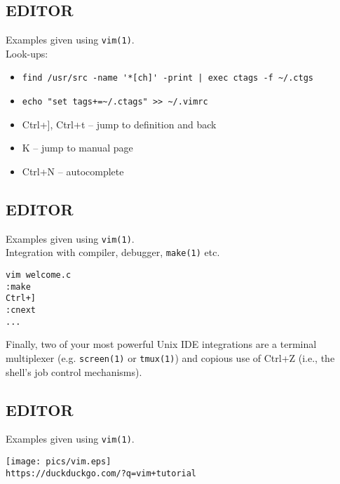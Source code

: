 \documentclass[xga]{xdvislides}
\begin{document}
\subsection{EDITOR}
Examples given using {\tt vim(1)}. \\

Look-ups:
\begin{itemize}
	\item \verb+find /usr/src -name '*[ch]' -print | exec ctags -f ~/.ctgs+
	\item \verb|echo "set tags+=~/.ctags" >> ~/.vimrc|
	\item Ctrl+], Ctrl+t -- jump to definition and back
	\item K -- jump to manual page
	\item Ctrl+N -- autocomplete
\end{itemize}

\subsection{EDITOR}
Examples given using {\tt vim(1)}. \\

Integration with compiler, debugger, \verb+make(1)+
etc.

\begin{verbatim}
vim welcome.c
:make
Ctrl+]
:cnext
...
\end{verbatim}
\vspace{.5in}

Finally, two of your most powerful Unix IDE
integrations are a terminal multiplexer (e.g.
\verb+screen(1)+ or \verb+tmux(1)+) and copious use
of Ctrl+Z (i.e., the shell's job control mechanisms).

\subsection{EDITOR}
Examples given using {\tt vim(1)}. \\

\begin{center}
	\texttt{[image: pics/vim.eps]} \\
	\verb|https://duckduckgo.com/?q=vim+tutorial|
\end{center}



%
%
\end{document}
